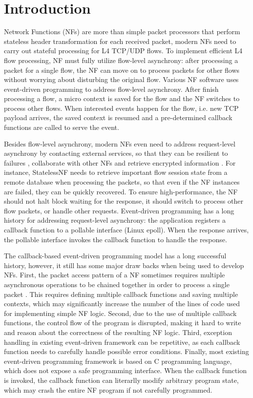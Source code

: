 \section{Introduction}

Network Functions (NFs) are more than simple packet processors that perform stateless header transformation for each received packet, modern NFs need to carry out stateful processing for L4 TCP/UDP flows. To implement efficient L4 flow processing, NF must fully utilize flow-level asynchrony: after processing a packet for a single flow, the NF can move on to process packets for other flows without worrying about disturbing the original flow. Various NF software \cite{snort, 201546, haproxy} uses event-driven programming to address flow-level asynchrony. After finish processing a flow, a micro context is saved for the flow and the NF switches to process other flows. When interested events happen for the flow, i.e. new TCP payload arrives, the saved context is resumed and a pre-determined callback functions are called to serve the event.

Besides flow-level asynchrony, modern NFs even need to address request-level asynchrony by contacting external services, so that they can be resilient to failures \cite{201545}, collaborate with other NFs \cite{3gpp-ims} and retrieve encrypted information \cite{sherry2015blindbox}. For instance, StatelessNF \cite{201545} needs to retrieve important flow session state from a remote database \cite{ousterhout2015ramcloud} when processing the packets, so that even if the NF instances are failed, they can be quickly recovered. To ensure high-performance, the NF should not halt block waiting for the response, it should switch to process other flow packets, or handle other requests. Event-driven programming has a long history for addressing request-level asynchrony: the application registers a callback function to a pollable interface (Linux epoll). When the response arrives, the pollable interface invokes the callback function to handle the response.

The callback-based event-driven programming model has a long successful history, however, it still has some major draw backs when being used to develop NFs. First, the packet access pattern of a NF sometimes requires multiple asynchronous operations to be chained together in order to process a single packet \cite{201545}. This requires defining multiple callback functions and saving multiple contexts, which may significantly increase the number of the lines of code used for implementing simple NF logic. Second, due to the use of multiple callback functions, the control flow of the program is disrupted, making it hard to write and reason about the correctness of the resulting NF logic. Third, exception handling in existing event-driven framework can be repetitive, as each callback function needs to carefully handle possible error conditions. Finally, most existing event-driven programming framework is based on C programming language, which does not expose a safe programming interface. When the callback function is invoked, the callback function can literarlly modify arbitrary program state, which may crash the entire NF program if not carefully programmed.

